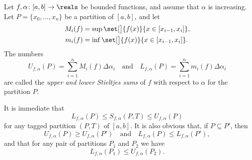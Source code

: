 \documentclass[article, a4paper, 11pt, oneside]{memoir}
\numberwithin{equation}{chapter}
\begin{document}
\begin{definition}
    Let $f, \alpha \colon [a,b] \to \reals$ be bounded functions, and assume that $\alpha$ is increasing. Let $P = \{x_0, \ldots, x_n\}$ be a partition of $[a,b]$, and let
    \begin{align*}
        M_i(f)
            &= \sup \set[\big]{f(x)}{x \in [x_{i-1}, x_i]}, \\
        m_i(f)
            &= \inf \set[\big]{f(x)}{x \in [x_{i-1}, x_i]}.
    \end{align*}
    The numbers
    \begin{equation*}
        U_{f,\alpha}(P)
            = \sum_{i=1}^n M_i(f) \Delta \alpha_i
        \quad \text{and} \quad
        L_{f,\alpha}(P)
            = \sum_{i=1}^n m_i(f) \Delta \alpha_i
    \end{equation*}
    are called the \emph{upper and lower Stieltjes sums} of $f$ with respect to $\alpha$ for the partition $P$.
\end{definition}
%
It is immediate that
%
\begin{equation*}
    L_{f,\alpha}(P)
        \leq S_{f,\alpha}(P,T)
        \leq U_{f,\alpha}(P)
\end{equation*}
%
for any tagged partition $(P,T)$ of $[a,b]$. It is also obvious that, if $P \subseteq P'$, then
%
\begin{equation*}
    U_{f,\alpha}(P) \geq U_{f,\alpha}(P')
    \quad \text{and} \quad
    L_{f,\alpha}(P) \leq L_{f,\alpha}(P'),
\end{equation*}
%
and that for any pair of partitions $P_1$ and $P_2$ we have
%
\begin{equation}
    \label{eq:upper-lower-sum-inequality}
    L_{f,\alpha}(P_1) \leq U_{f,\alpha}(P_2).
\end{equation}


\def\upint{\mathchoice%
    {\mkern10mu\overline{\vphantom{\intop}\mkern10mu}\mkern-20mu}%
    {\mkern7mu\overline{\vphantom{\intop}\mkern7mu}\mkern-14mu}%
    {\mkern7mu\overline{\vphantom{\intop}\mkern7mu}\mkern-14mu}%
    {\mkern7mu\overline{\vphantom{\intop}\mkern7mu}\mkern-14mu}%
  \int}
\def\lowint{\mkern2mu\underline{\vphantom{\intop}\mkern10mu}\mkern-12mu\int}
\end{document}
